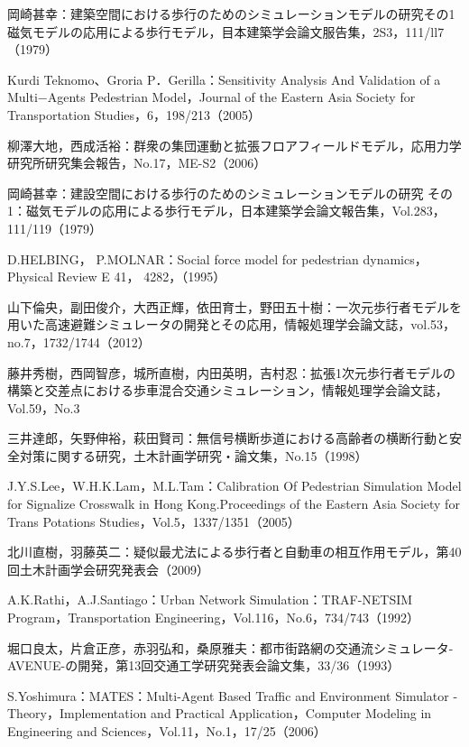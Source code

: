 \begin{thebibliography}{99}
  岡崎甚幸：建築空間における歩行のためのシミュレーションモデルの研究その1 磁気モデルの応用による歩行モデル，目本建築学会論文服告集，2S3，111/ll7（1979）

  Kurdi Teknomo、Groria P．Gerilla：Sensitivity Analysis And Validation of a Multi−Agents Pedestrian Model，Journal of the Eastern Asia Society for Transportation Studies，6，198/213（2005）

  柳澤大地，西成活裕：群衆の集団運動と拡張フロアフィールドモデル，応用力学研究所研究集会報告，No.17，ME-S2（2006）

  岡崎甚幸：建設空間における歩行のためのシミュレーションモデルの研究 その1：磁気モデルの応用による歩行モデル，日本建築学会論文報告集，Vol.283，111/119（1979）

  D.HELBING， P.MOLNAR：Social force model for pedestrian dynamics， Physical Review E 41， 4282，（1995）

  山下倫央，副田俊介，大西正輝，依田育士，野田五十樹：一次元歩行者モデルを用いた高速避難シミュレータの開発とその応用，情報処理学会論文誌，vol.53，no.7，1732/1744（2012）

  藤井秀樹，西岡智彦，城所直樹，内田英明，吉村忍：拡張1次元歩行者モデルの構築と交差点における歩車混合交通シミュレーション，情報処理学会論文誌，Vol.59，No.3

  三井達郎，矢野伸裕，萩田賢司：無信号横断歩道における高齢者の横断行動と安全対策に関する研究，土木計画学研究・論文集，No.15（1998）

  J.Y.S.Lee，W.H.K.Lam，M.L.Tam：Calibration Of Pedestrian Simulation Model for Signalize Crosswalk in Hong Kong.Proceedings of the Eastern Asia Society for Trans Potations Studies，Vol.5，1337/1351（2005）

  北川直樹，羽藤英二：疑似最尤法による歩行者と自動車の相互作用モデル，第40回土木計画学会研究発表会（2009）

  A.K.Rathi，A.J.Santiago：Urban Network Simulation：TRAF-NETSIM Program，Transportation Engineering，Vol.116，No.6，734/743（1992）

  堀口良太，片倉正彦，赤羽弘和，桑原雅夫：都市街路網の交通流シミュレータ-AVENUE-の開発，第13回交通工学研究発表会論文集，33/36（1993）

  S.Yoshimura：MATES：Multi-Agent Based Traffic and Environment Simulator - Theory，Implementation and Practical Application，Computer Modeling in Engineering and Sciences，Vol.11，No.1，17/25（2006）


\end{thebibliography}

